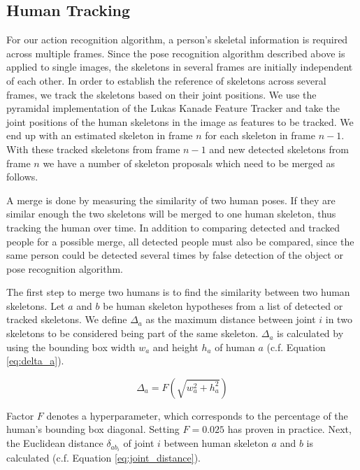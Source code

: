 \documentclass[a4paper, 10pt, conference]{ieeeconf}
\begin{document}
\subsection{Human Tracking}
\label{sec:human_tracking}
For our action recognition algorithm, a person's skeletal information is required across multiple frames. Since the pose recognition algorithm described above is applied to single images, the skeletons in several frames are initially independent of each other. In order to establish the reference of skeletons across several frames, we track the skeletons based on their joint positions. We use the pyramidal implementation of the Lukas Kanade Feature Tracker \cite{bouguetPyramidalImplementationLucas2000} and take the joint positions of the human skeletons in the image as features to be tracked. We end up with an estimated skeleton in frame $n$ for each skeleton in frame $n-1$. With these tracked skeletons from frame $n-1$ and new detected skeletons from frame $n$ we have a number of skeleton proposals which need to be merged as follows. 

A merge is done by measuring the similarity of two human poses. If they are similar enough the two skeletons will be merged to one human skeleton, thus tracking the human over time. In addition to comparing detected and tracked people for a possible merge, all detected people must also be compared, since the same person could be detected several times by false detection of the object or pose recognition algorithm.

The first step to merge two humans is to find the similarity between two human skeletons. Let $a$ and $b$ be human skeleton hypotheses from a list of detected or tracked skeletons. We define $\Delta_{a}$ as the maximum distance between joint $i$ in two skeletons to be considered being part of the same skeleton. $\Delta_{a}$ is calculated by using the bounding box width $w_a$ and height $h_a$ of human $a$ (c.f. Equation \ref{eq:delta_a}).

\begin{equation}
  \label{eq:delta_a}
  \Delta_{a} = F(\sqrt{w_{a}^2 + h_{a}^2})
\end{equation}

Factor $F$ denotes a hyperparameter, which corresponds to the percentage of the human's bounding box diagonal. Setting $F=0.025$ has proven in practice. Next, the Euclidean distance $\delta_{ab_{i}}$ of joint $i$ between human skeleton $a$ and $b$ is calculated (c.f. Equation \ref{eq:joint_distance}). 
\end{document}
